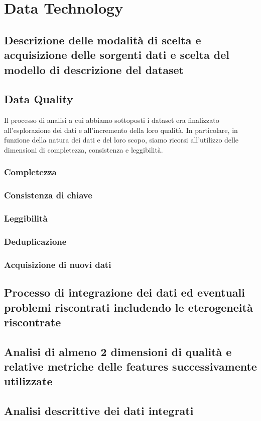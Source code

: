 \setcounter{chapter}{0}

\part{Data Technology}

\chapter{Descrizione delle modalità di scelta e acquisizione delle sorgenti dati e scelta del modello di descrizione del dataset}

\chapter{Data Quality}


Il processo di analisi a cui abbiamo sottoposti i dataset era finalizzato all'esplorazione dei dati e all'incremento della loro qualità. In particolare, in funzione della natura dei dati e del loro scopo, siamo ricorsi all'utilizzo delle dimensioni di completezza, consistenza e leggibilità.


\section{Completezza}

\section{Consistenza di chiave}

\section{Leggibilità}

\section{Deduplicazione}

\section{Acquisizione di nuovi dati}

\chapter{Processo di integrazione dei dati ed eventuali problemi riscontrati includendo le eterogeneità riscontrate}



\chapter{Analisi di almeno 2 dimensioni di qualità e relative metriche delle features successivamente utilizzate}
\chapter{Analisi descrittive dei dati integrati}

